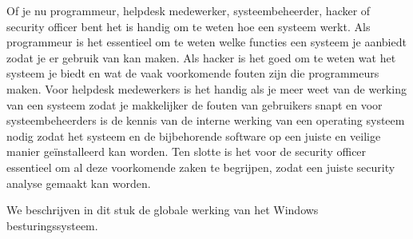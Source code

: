 Of je nu programmeur, helpdesk medewerker, systeembeheerder, hacker of security officer bent het is handig om te weten hoe een systeem werkt. Als programmeur is het essentieel om te weten welke functies een systeem je aanbiedt zodat je er gebruik van kan maken. Als hacker is het goed om te weten wat het systeem je biedt en wat de vaak voorkomende fouten zijn die programmeurs maken. Voor helpdesk medewerkers is het handig als je meer weet van de werking van een systeem zodat je makkelijker de fouten van gebruikers snapt en voor systeembeheerders is de kennis van de interne werking van een operating systeem nodig zodat het systeem en de bijbehorende software op een juiste en veilige manier ge\"installeerd kan worden. Ten slotte is het voor de security officer essentieel om al deze voorkomende zaken te begrijpen, zodat een juiste security analyse gemaakt kan worden.

We beschrijven in dit stuk de globale werking van het Windows besturingssysteem.

